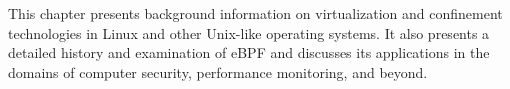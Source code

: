 This chapter presents background information on virtualization and confinement
technologies in Linux and other Unix-like operating systems. It also presents a detailed
history and examination of eBPF and discusses its applications in the domains of computer
security, performance monitoring, and beyond.

